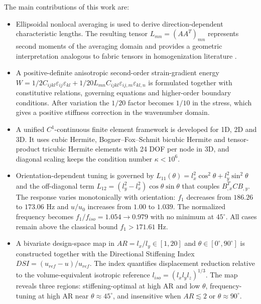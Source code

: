 \documentclass[final,3p,times,fleqn]{elsarticle}
\newcommand{\rev}[1]{\textcolor{revcolor}{#1}}
\begin{document}
The main contributions of this work are:
\begin{itemize}
  \item \rev{Ellipsoidal nonlocal averaging is used to derive direction-dependent characteristic lengths. The resulting tensor $L_{mn}=(AA^T)_{mn}$ represents second moments of the averaging domain and provides a geometric interpretation analogous to fabric tensors in homogenization literature \cite{LazarPo2015,Polizzotto2018,Auffray2019}.}
  \item \rev{A positive-definite anisotropic second-order strain-gradient energy $W=1/2 C_{ijkl}\varepsilon_{ij}\varepsilon_{kl}+1/20 L_{mn}C_{ijkl}\varepsilon_{ij,m}\varepsilon_{kl,n}$ is formulated together with constitutive relations, governing equations and higher-order boundary conditions. After variation the $1/20$ factor becomes $1/10$ in the stress, which gives a positive stiffness correction in the wavenumber domain.}
  \item \rev{A unified $C^{1}$-continuous finite element framework is developed for 1D, 2D and 3D. It uses cubic Hermite, Bogner--Fox--Schmit bicubic Hermite and tensor-product tricubic Hermite elements with 24 DOF per node in 3D, and diagonal scaling keeps the condition number $\kappa<10^6$.}
  \item \rev{Orientation-dependent tuning is governed by $L_{11}(\theta)=l_x^2\cos^2\theta+l_y^2\sin^2\theta$ and the off-diagonal term $L_{12}=(l_y^2-l_x^2)\cos\theta\sin\theta$ that couples $B_{,x}^T C B_{,y}$. The response varies monotonically with orientation: $f_1$ decreases from $186.26$ to $173.06$ Hz and $u/u_0$ increases from $1.00$ to $1.039$. The normalized frequency becomes $f_1/f_{iso}=1.054\to0.979$ with no minimum at $45^\circ$. All cases remain above the classical bound $f_1>171.61$ Hz.}
  \item \rev{A bivariate design-space map in $AR=l_x/l_y\in[1,20]$ and $\theta\in[0^\circ,90^\circ]$ is constructed together with the Directional Stiffening Index $DSI=(u_{ref}-u)/u_{ref}$. The index quantifies displacement reduction relative to the volume-equivalent isotropic reference $l_{iso}=(l_xl_yl_z)^{1/3}$. The map reveals three regions: stiffening-optimal at high AR and low $\theta$, frequency-tuning at high AR near $\theta\approx45^\circ$, and insensitive when $AR\lesssim2$ or $\theta\approx90^\circ$.}
\end{itemize}



\end{document}
